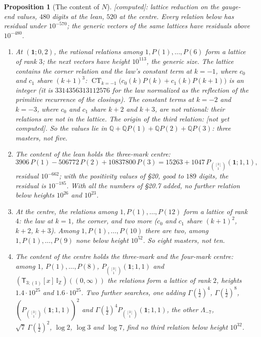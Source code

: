 \documentclass[11pt]{article}
\newcommand{\one}{\mathbf 1}
\newcommand{\sT}{\mathsf T}
\newcommand{\IZ}{\mathbb I_{\mathbb Z}}
\newcommand{\Tx}[3]{(\sT_{#1;(1)}[x]\,#2)((#3,\infty))}
\DeclareMathOperator*{\CT}{CT}
\newcommand{\Pth}{P_{\binom{[3]}1}(\one;1,1)}
\newcommand{\Zt}{\Tx3{\IZ}0}
\theoremstyle{plain}
\newtheorem{proposition}{Proposition}[section]
\theoremstyle{definition}
\theoremstyle{remark}
\newcommand{\computed}{\textup{[computed]}}
\newcommand{\notyet}{\textup{[not yet computed]}}
\begin{document}
\begin{proposition}[The content of $N$]\label{d:p:Ncontent}\computed: lattice reduction on the gauge-end values, $480$ digits at the lean, $520$ at the centre. Every relation below has residual under $10^{-570}$; the generic vectors of the same lattices have residuals above $10^{-480}$.
\begin{enumerate}[label=(\roman*)]
\item At $(\one;0,2)$, the rational relations among $1,P(1),\dots,P(6)$ form a lattice of rank $3$; the next vectors have height $10^{113}$, the generic size. The lattice contains the corner relation and the law's constant term at $k=-1$, where $c_0$ and $c_1$ share $(k+1)^3$: $\CT_{k=-1}\big(c_0(k)P(k)+c_1(k)P(k+1)\big)$ is an integer (it is $3314356313112576$ for the law normalized as the reflection of the primitive recurrence of the closings). The constant terms at $k=-2$ and $k=-3$, where $c_0$ and $c_1$ share $k+2$ and $k+3$, are not rational: their relations are not in the lattice. The origin of the third relation: \notyet. So the values lie in $\mathbb Q+\mathbb QP(1)+\mathbb QP(2)+\mathbb QP(3)$: three masters, not five.
\item The content of the lean holds the three-mark centre:
\[
3906\,P(1)-506772\,P(2)+10837800\,P(3)=15263+1047\,\Pth ,
\]
residual $10^{-662}$; with the positivity values of \S20, good to $189$ digits, the residual is $10^{-185}$. With all the numbers of \S20.7 added, no further relation below heights $10^{26}$ and $10^{23}$.
\item At the centre, the relations among $1,P(1),\dots,P(12)$ form a lattice of rank $4$: the law at $k=1$, the corner, and two more ($c_0$ and $c_1$ share $(k+1)^2$, $k+2$, $k+3$). Among $1,P(1),\dots,P(10)$ there are two, among $1,P(1),\dots,P(9)$ none below height $10^{52}$. So eight masters, not ten.
\item The content of the centre holds the three-mark and the four-mark centre: among $1$, $P(1),\dots,P(8)$, $\Pth$ and $\Zt$ the relations form a lattice of rank $2$, heights $1.4\cdot10^{25}$ and $1.6\cdot10^{25}$. Two further searches, one adding $\Gamma(\frac12)^4$, $\Gamma(\frac12)^8$, $(\Pth)^2$ and $\Gamma(\frac12)^4\Pth$, the other $\Lambda_{-7}$, $\sqrt7\,\Gamma(\frac12)^2$, $\log2$, $\log3$ and $\log7$, find no third relation below height $10^{32}$.
\end{enumerate}
\end{proposition}
\end{document}
